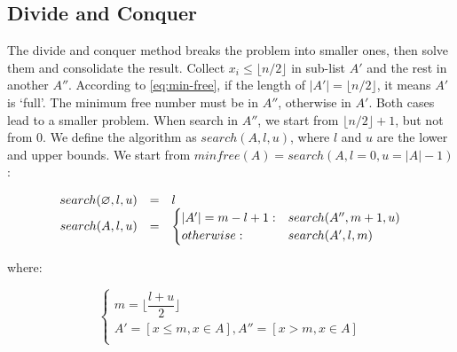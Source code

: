 \documentclass[b5paper]{article}
\begin{document}




\subsection*{Divide and Conquer}
The divide and conquer method breaks the problem into smaller ones, then solve them and consolidate the result. Collect $x_i \leq \lfloor n/2 \rfloor$ in sub-list $A'$ and the rest in another $A''$. According to \cref{eq:min-free}, if the length of $|A'| = \lfloor n/2 \rfloor$, it means $A'$ is `full'. The minimum free number must be in $A''$, otherwise in $A'$. Both cases lead to a smaller problem. When search in $A''$, we start from $\lfloor n/2 \rfloor + 1$, but not from $0$. We define the algorithm as $search(A, l, u)$, where $l$ and $u$ are the lower and upper bounds. We start from $minfree(A) = search(A, l = 0, u = |A|-1)$:

\[
\begin{array}{rcl}
search(\varnothing, l, u) & = & l \\
search(A, l, u) & = & \begin{cases}
       |A'| = m - l + 1 : & search(A'', m+1, u) \\
       otherwise : & search(A',  l, m) \\
\end{cases}
\end{array}
\]

where:

\[
\begin{cases}
m = \lfloor \dfrac{l + u}{2} \rfloor \\
A' = [x \leq m, x \in A], A'' = [x > m, x \in A] \\
\end{cases}
\]
\end{document}
